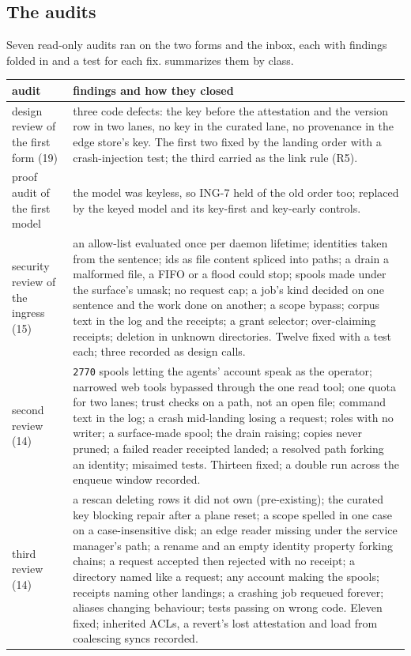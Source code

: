\documentclass[11pt]{article}
\theoremstyle{plain}
\theoremstyle{definition}
\theoremstyle{remark}
\newcommand{\code}[1]{\texttt{#1}}
\newcommand{\ing}[1]{ING-#1}
\begin{document}
\subsection{The audits}

Seven read-only audits ran on the two forms and the inbox, each with findings folded in and a
test for each fix.  summarizes them by class.

\begin{table}[tp]
\centering\footnotesize
\begin{tabular}{>{\raggedright\arraybackslash}p{}>{\raggedright\arraybackslash}p{}}
\toprule
audit & findings and how they closed \\
\midrule
design review of the first form (19) & three code defects: the key before the attestation and the version row in two lanes, no key in the curated lane, no provenance in the edge store's key. The first two fixed by the landing order with a crash-injection test; the third carried as the link rule (R5). \\
proof audit of the first model & the model was keyless, so \ing{7} held of the old order too; replaced by the keyed model and its key-first and key-early controls. \\
security review of the ingress (15) & an allow-list evaluated once per daemon lifetime; identities taken from the sentence; ids as file content spliced into paths; a drain a malformed file, a FIFO or a flood could stop; spools made under the surface's umask; no request cap; a job's kind decided on one sentence and the work done on another; a scope bypass; corpus text in the log and the receipts; a grant selector; over-claiming receipts; deletion in unknown directories. Twelve fixed with a test each; three recorded as design calls. \\
second review (14) & \code{2770} spools letting the agents' account speak as the operator; narrowed web tools bypassed through the one read tool; one quota for two lanes; trust checks on a path, not an open file; command text in the log; a crash mid-landing losing a request; roles with no writer; a surface-made spool; the drain raising; copies never pruned; a failed reader receipted landed; a resolved path forking an identity; misaimed tests. Thirteen fixed; a double run across the enqueue window recorded. \\
third review (14) & a rescan deleting rows it did not own (pre-existing); the curated key blocking repair after a plane reset; a scope spelled in one case on a case-insensitive disk; an edge reader missing under the service manager's path; a rename and an empty identity property forking chains; a request accepted then rejected with no receipt; a directory named like a request; any account making the spools; receipts naming other landings; a crashing job requeued forever; aliases changing behaviour; tests passing on wrong code. Eleven fixed; inherited ACLs, a revert's lost attestation and load from coalescing syncs recorded. \\

\end{tabular}
\end{table}
\end{document}
